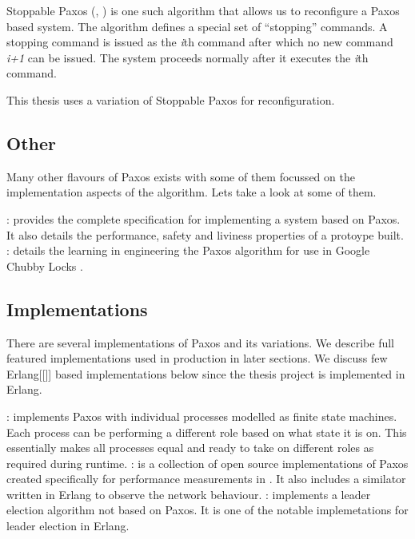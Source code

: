 Stoppable Paxos (\citet{LamportSP08}, \citet{LamportMZ10}) is one such algorithm
that allows us to reconfigure a Paxos based system. The algorithm defines a
special set of ``stopping'' commands. A stopping command is issued as the
\emph{i}th command after which no new command \emph{i+1} can be issued. The 
system proceeds normally after it executes the \emph{i}th command.

This thesis uses a variation of Stoppable Paxos for reconfiguration.

\subsection{Other}

Many other flavours of Paxos exists with some of them focussed on the 
implementation aspects of the algorithm. Lets take a look at some of them.

\begin{itemize}
    : \citet{Kirsch08paxosfor} provides the
    complete specification for implementing a system based on Paxos. It also
    details the performance, safety and liviness properties of a protoype built.
    : \cite{ChandraGR07}
    details the learning in engineering the Paxos algorithm for use in
    Google Chubby Locks \citep{Burrows06}.
\end{itemize}

\subsection{Implementations}

There are several implementations of Paxos and its variations. We describe full
featured implementations used in production in later sections. We discuss few
Erlang[[]] based implementations below since the thesis project is implemented
in Erlang.

\begin{itemize}
    : \citep{Uenishi2012} implements Paxos with
    individual processes modelled as finite state machines. Each process can
    be performing a different role based on what state it is on. This 
    essentially makes all processes equal and ready to take on different roles
    as required during runtime.
    : \citet{Lugano2012} is a collection of open source 
    implementations of Paxos created specifically for performance measurements
    in \citet{MarandiPSP10}. It also includes a similator written in Erlang to
    observe the network behaviour.
    : \citet{Ulf2012} implements a leader election algorithm
    not based on Paxos. It is one of the notable implemetations for leader
    election in Erlang.
\end{itemize}

